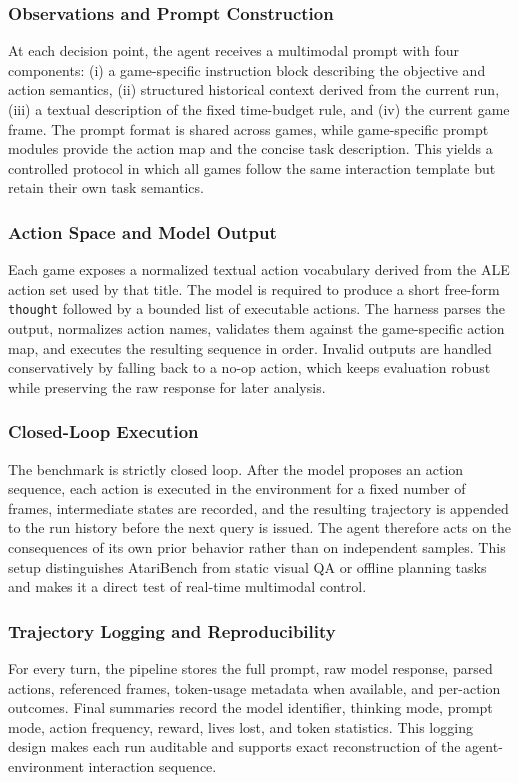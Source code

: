 \subsubsection{Observations and Prompt Construction}
At each decision point, the agent receives a multimodal prompt with four components: (i) a game-specific instruction block describing the objective and action semantics, (ii) structured historical context derived from the current run, (iii) a textual description of the fixed time-budget rule, and (iv) the current game frame. The prompt format is shared across games, while game-specific prompt modules provide the action map and the concise task description. This yields a controlled protocol in which all games follow the same interaction template but retain their own task semantics.

\subsubsection{Action Space and Model Output}
Each game exposes a normalized textual action vocabulary derived from the ALE action set used by that title. The model is required to produce a short free-form \texttt{thought} followed by a bounded list of executable actions. The harness parses the output, normalizes action names, validates them against the game-specific action map, and executes the resulting sequence in order. Invalid outputs are handled conservatively by falling back to a no-op action, which keeps evaluation robust while preserving the raw response for later analysis.

\subsubsection{Closed-Loop Execution}
The benchmark is strictly closed loop. After the model proposes an action sequence, each action is executed in the environment for a fixed number of frames, intermediate states are recorded, and the resulting trajectory is appended to the run history before the next query is issued. The agent therefore acts on the consequences of its own prior behavior rather than on independent samples. This setup distinguishes AtariBench from static visual QA or offline planning tasks and makes it a direct test of real-time multimodal control.

\subsubsection{Trajectory Logging and Reproducibility}
For every turn, the pipeline stores the full prompt, raw model response, parsed actions, referenced frames, token-usage metadata when available, and per-action outcomes. Final summaries record the model identifier, thinking mode, prompt mode, action frequency, reward, lives lost, and token statistics. This logging design makes each run auditable and supports exact reconstruction of the agent-environment interaction sequence.

